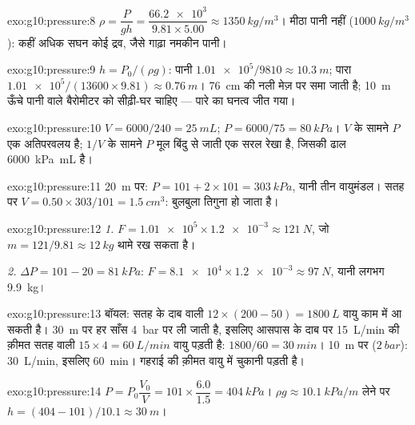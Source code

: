 \begin{solution}{exo:g10:pressure:8}
$\rho = \dfrac{P}{g h} = \dfrac{\num{66.2e3}}{9.81 \times 5.00}
\approx \qty{1350}{kg/m^3}$। मीठा पानी नहीं ($\qty{1000}{kg/m^3}$): कहीं अधिक सघन कोई द्रव, जैसे गाढ़ा
नमकीन पानी।
\end{solution}

\begin{solution}{exo:g10:pressure:9}
$h = P_0/(\rho g)$: पानी $\num{1.01e5}/9810 \approx \qty{10.3}{m}$; पारा $\num{1.01e5}/(13600 \times 9.81) \approx \qty{0.76}{m}$। \qty{76}{cm} की नली मेज़ पर समा जाती है;
\qty{10}{m} ऊँचे पानी वाले बैरोमीटर को सीढ़ी-घर चाहिए --- पारे का घनत्व
जीत गया।
\end{solution}

\begin{solution}{exo:g10:pressure:10}
$V = 6000/240 = \qty{25}{mL}$; $P = 6000/75 = \qty{80}{kPa}$। $V$ के सामने $P$ एक अतिपरवलय है; $1/V$ के सामने
$P$ मूल बिंदु से जाती एक सरल रेखा है, जिसकी ढाल \qty{6000}{kPa.mL} है।
\end{solution}

\begin{solution}{exo:g10:pressure:11}
\qty{20}{m} पर: $P = 101 + 2 \times 101 = \qty{303}{kPa}$, यानी तीन वायुमंडल। सतह पर $V = 0.50 \times 303/101 = \qty{1.5}{cm^3}$: बुलबुला तिगुना हो
जाता है।
\end{solution}

\begin{solution}{exo:g10:pressure:12}
\emph{1.} $F = \num{1.01e5} \times \num{1.2e-3} \approx \qty{121}{N}$, जो $m = 121/9.81 \approx \qty{12}{kg}$ थामे रख सकता है।

\emph{2.} $\Delta P = 101 - 20 = \qty{81}{kPa}$: $F = \num{8.1e4} \times \num{1.2e-3} \approx \qty{97}{N}$, यानी लगभग \qty{9.9}{kg}।
\end{solution}

\begin{solution}{exo:g10:pressure:13}
बॉयल: सतह के दाब वाली $12 \times (200 - 50) = \qty{1800}{L}$ वायु काम में आ सकती है। \qty{30}{m} पर
हर साँस \qty{4}{bar} पर ली जाती है, इसलिए आसपास के दाब पर \qty{15}{L/min} की
क़ीमत सतह वाली $15 \times 4 = \qty{60}{L/min}$ वायु पड़ती है: $1800/60 =
\qty{30}{min}$। \qty{10}{m} पर ($\qty{2}{bar}$): \qty{30}{L/min},
इसलिए \qty{60}{min}। गहराई की क़ीमत वायु में चुकानी पड़ती है।
\end{solution}

\begin{solution}{exo:g10:pressure:14}
$P = P_0 \dfrac{V_0}{V} = 101 \times \dfrac{6.0}{1.5} =
\qty{404}{kPa}$। $\rho g \approx \qty{10.1}{kPa/m}$ लेने पर $h = (404 - 101)/10.1 \approx \qty{30}{m}$।
\end{solution}


